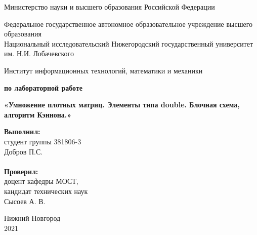 \documentclass{report}
\begin{document}
\begin{titlepage}

\begin{center}
Министерство науки и высшего образования Российской Федерации
\end{center}

\begin{center}
Федеральное государственное автономное образовательное учреждение высшего образования \\
Национальный исследовательский Нижегородский государственный университет им. Н.И. Лобачевского
\end{center}

\begin{center}
Институт информационных технологий, математики и механики
\end{center}

\vspace{4em}

\begin{center}
\textbf{ по лабораторной работе} \\
\end{center}
\begin{center}
\textbf{\Large«Умножение плотных матриц. Элементы типа double. Блочная схема, алгоритм Кэннона.»} \\
\end{center}

\vspace{4em}

\newbox{\lbox}
\newlength{\maxl}
\setlength{\maxl}{\wd\lbox}
\hfill\parbox{7cm}{
\hspace*{5cm}\hspace*{-5cm}\textbf{Выполнил:} \\ студент группы 381806-3 \\ Добров П.С. \\
\\
\hspace*{5cm}\hspace*{-5cm}\textbf{Проверил:}\\ доцент кафедры МОСТ, \\ кандидат технических наук \\ Сысоев А. В.\\}

\vspace{\fill}

\begin{center} Нижний Новгород \\ 2021 \end{center}

\end{titlepage}
\end{document}
